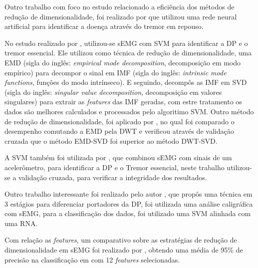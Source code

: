 Outro trabalho com foco no estudo relacionado a eficiência dos métodos de redução de dimensionalidade, foi realizado por  que utilizou uma rede neural artificial para identificar a doença através do tremor em repouso. 

No estudo realizado por , utilizou-se sEMG com SVM para identificar a DP e o tremor essencial. Ele utilizou como técnica de redução de dimensionalidade, uma EMD (sigla do inglês: \textit{empirical mode decomposition}, decomposição em modo empírico) para decompor o sinal em IMF (sigla do inglês: \textit{intrinsic mode functions}, funções do modo intrínseco). E seguindo, decompôs as IMF em SVD (sigla do inglês: \textit{singular value decomposition}, decomposição em valores singulares) para extrair as \textit{features} das IMF geradas, com estre tratamento os dados são melhores calculados e processados pelo algoritimo SVM. Outro método de redução de dimensionalidade, foi aplicado por , no qual foi comparado o desempenho comutando a EMD pela DWT e verificou através de validação cruzada que o método EMD-SVD foi superior ao método DWT-SVD.

A SVM também foi utilizada por , que combinou sEMG com sinais de um acelerômetro, para identificar a DP e o Tremor essencial, neste trabalho utilizou-se a validação cruzada, para verificar a integridade dos resultados.

Outro trabalho interessante foi realizado pelo autor , que propôs uma técnica em 3 estágios para diferenciar portadores da DP, foi utilizada uma análise caligráfica com sEMG, para a classificação dos dados, foi utilizado uma SVM alinhada com uma RNA.

Com relação as \textit{features}, um comparativo sobre as estratégias de redução de dimensionalidade em sEMG foi realizado por , obtendo uma média de 95\% de precisão na classificação em com 12 \textit{features} selecionadas. 